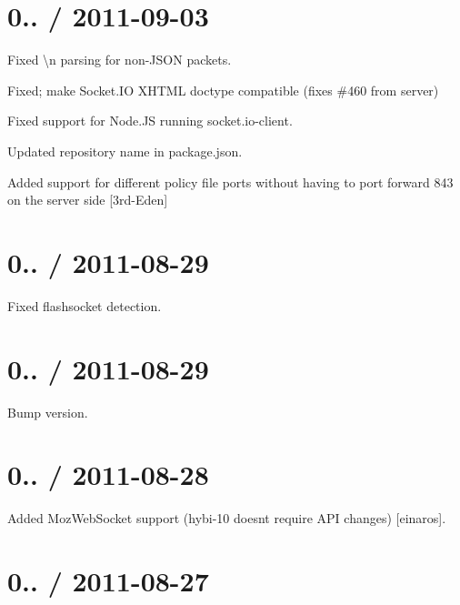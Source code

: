 \section*{0.. / 2011-\/09-\/03 }


\begin{DoxyItemize}
\item Fixed {\ttfamily \textbackslash{}n} parsing for non-\/\+J\+S\+ON packets.
\item Fixed; make Socket.\+IO X\+H\+T\+ML doctype compatible (fixes \#460 from server)
\item Fixed support for Node.\+JS running {\ttfamily socket.\+io-\/client}.
\item Updated repository name in {\ttfamily package.\+json}.
\item Added support for different policy file ports without having to port forward 843 on the server side \mbox{[}3rd-\/\+Eden\mbox{]}
\end{DoxyItemize}

\section*{0.. / 2011-\/08-\/29 }


\begin{DoxyItemize}
\item Fixed flashsocket detection.
\end{DoxyItemize}

\section*{0.. / 2011-\/08-\/29 }


\begin{DoxyItemize}
\item Bump version.
\end{DoxyItemize}

\section*{0.. / 2011-\/08-\/28 }


\begin{DoxyItemize}
\item Added Moz\+Web\+Socket support (hybi-\/10 doesn\textquotesingle{}t require A\+PI changes) \mbox{[}einaros\mbox{]}.
\end{DoxyItemize}

\section*{0.. / 2011-\/08-\/27 }


